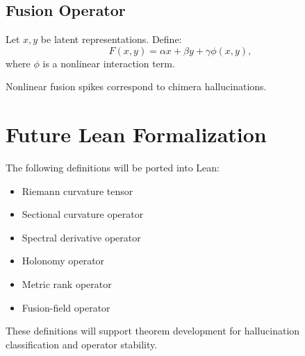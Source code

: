 \documentclass[11pt]{article}
\begin{document}
\subsection{Fusion Operator}
Let $x, y$ be latent representations. Define:
\[
F(x,y) = \alpha x + \beta y + \gamma \phi(x,y),
\]
where $\phi$ is a nonlinear interaction term.

Nonlinear fusion spikes correspond to chimera hallucinations.

\section{Future Lean Formalization}
The following definitions will be ported into Lean:

\begin{itemize}
    \item Riemann curvature tensor
    \item Sectional curvature operator
    \item Spectral derivative operator
    \item Holonomy operator
    \item Metric rank operator
    \item Fusion-field operator
\end{itemize}

These definitions will support theorem development for hallucination 
classification and operator stability.
\end{document}
